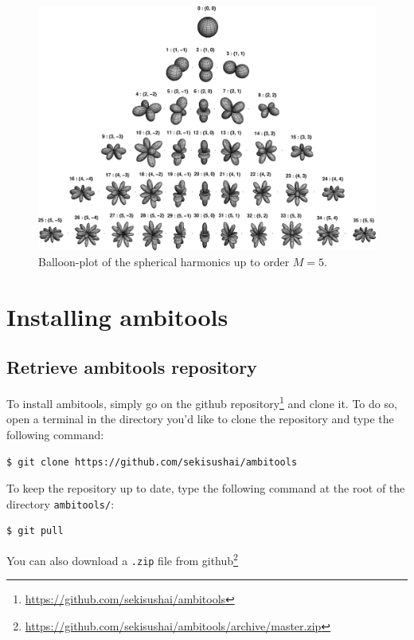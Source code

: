 \documentclass[10pt,a4paper]{article}
\begin{document}
\begin{figure}[ht]
\includegraphics[width=\columnwidth]{Fig_YACN.png}
\caption{Balloon-plot of the spherical harmonics up to order $M=5$.}
\label{fig:spherical_harmonics}
\end{figure}

\pagebreak
\section{Installing ambitools}

\subsection{Retrieve ambitools repository}
To install ambitools, simply go on the github repository\footnote{\url{https://github.com/sekisushai/ambitools}} and clone it. To do so, open a terminal in the directory you'd like to clone the repository and type the following command:

\begin{lstlisting}
$ git clone https://github.com/sekisushai/ambitools
\end{lstlisting}

To keep the repository up to date, type the following command at the root of the directory \lstinline`ambitools/`:

\begin{lstlisting}
$ git pull
\end{lstlisting}

You can also download a \lstinline'.zip' file from github\footnote{\url{https://github.com/sekisushai/ambitools/archive/master.zip}}
\end{document}
